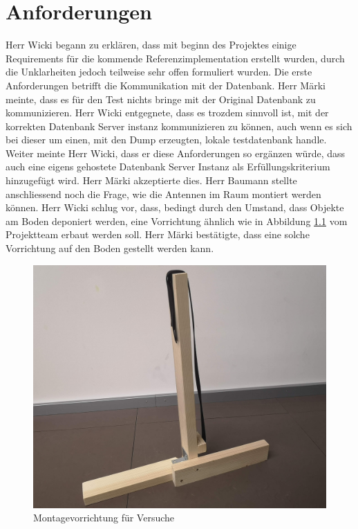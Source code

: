 \documentclass[parskip=full, a4paper]{scrreprt}
\begin{document}
\chapter{Anforderungen}
Herr Wicki begann zu erklären, dass mit beginn des Projektes einige Requirements für die kommende Referenzimplementation erstellt wurden, durch die Unklarheiten jedoch teilweise sehr offen formuliert wurden. Die erste Anforderungen betrifft die Kommunikation mit der Datenbank. Herr Märki meinte, dass es für den Test nichts bringe mit der Original Datenbank zu kommunizieren. Herr Wicki entgegnete, dass es trozdem sinnvoll ist, mit der korrekten Datenbank Server instanz kommunizieren zu können, auch wenn es sich bei dieser um einen, mit den Dump erzeugten, lokale testdatenbank handle. Weiter meinte Herr Wicki, dass er diese Anforderungen so ergänzen würde, dass auch eine eigens gehostete Datenbank Server Instanz als Erfüllungskriterium hinzugefügt wird. Herr Märki akzeptierte dies.
Herr Baumann stellte anschliessend noch die Frage, wie die Antennen im Raum montiert werden können. Herr Wicki schlug vor, dass, bedingt durch den Umstand, dass Objekte am Boden deponiert werden, eine Vorrichtung ähnlich wie in Abbildung \ref{fig:montagevorrichtung} vom Projektteam erbaut werden soll. Herr Märki bestätigte, dass eine solche Vorrichtung auf den Boden gestellt werden kann.
\begin{figure}[htb]
	\centering
	\includegraphics[keepaspectratio,width=.7\linewidth]{img/Montagevorrichtung}
	\caption{Montagevorrichtung für Versuche}
	\label{fig:montagevorrichtung}
\end{figure}
\end{document}
